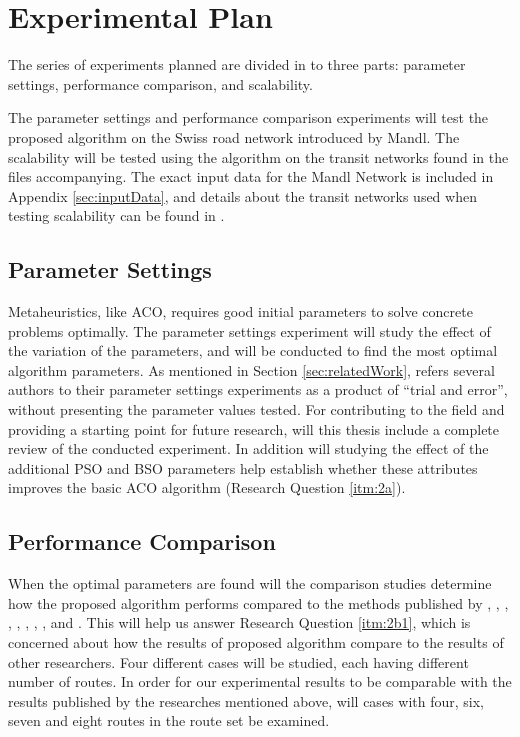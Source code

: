 \section{Experimental Plan}
\label{sec:expPlan}
The series of experiments planned are divided in to three parts: parameter settings, performance comparison, and scalability.

The parameter settings and performance comparison experiments will test the proposed algorithm on the Swiss road network introduced by Mandl\citep{mandl79}. The scalability will be tested using the algorithm on the transit networks found in the files accompanying\citet{mumford13}. The exact input data for the Mandl Network is included in Appendix \vref{sec:inputData}, and details about the transit networks used when testing scalability can be found in \citet{mumford13}.

\subsection{Parameter Settings}
Metaheuristics, like ACO, requires good initial parameters to solve concrete problems optimally. The parameter settings experiment will study the effect of the variation of the parameters, and will be conducted to find the most optimal algorithm parameters. As mentioned in Section \vref{sec:relatedWork}, refers several authors to their parameter settings experiments as a product of ``trial and error'', without presenting the parameter values tested. For contributing to the field and providing a starting point for future research, will this thesis include a complete review of the conducted experiment. %
In addition will studying the effect of the additional PSO and BSO parameters help establish whether these attributes improves the basic ACO algorithm (Research Question \vref{itm:2a}).

\subsection{Performance Comparison}
When the optimal parameters are found will the comparison studies determine how the proposed algorithm performs compared to the methods published by \citet{mandl79}, \citet{kechagiopoulos14}, \citet{nikolic14}, \citet{kidwai98}, \citet{fan10}, \citet{chakroborty02}, \citet{zhang10}, \citet{chew12}, and \citet{baaj91}. This will help us answer Research Question \vref{itm:2b1}, which is concerned about how the results of proposed algorithm compare to the results of other researchers. Four different cases will be studied, each having different number of routes. In order for our experimental results to be comparable with the results published by the researches mentioned above, will cases with four, six, seven and eight routes in the route set be examined.


